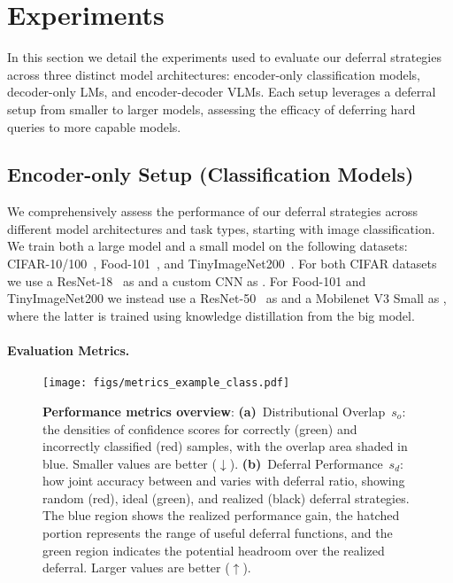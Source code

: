 \section{Experiments}
\label{sec:experiments}

In this section we detail the experiments used to evaluate our deferral strategies across three distinct model architectures: encoder-only classification models, decoder-only LMs, and encoder-decoder VLMs. Each setup leverages a deferral setup from smaller to larger models, assessing the efficacy of deferring hard queries to more capable models. 

\sloppy
\subsection{Encoder-only Setup (Classification Models)}
\label{sec:class_exp}

We comprehensively assess the performance of our deferral strategies across different model architectures and task types, starting with image classification. We train both a large model and a small model on the following datasets: CIFAR-10/100~\citep{krizhevsky2009learning}, Food-101~\citep{bossard14}, and TinyImageNet200~\citep{Le2015TinyIV}. For both CIFAR datasets we use a ResNet-18~\citep{he2016deep} as \bigmodel and a custom CNN as \smallmodel. For Food-101 and TinyImageNet200 we instead use a ResNet-50~\citep{he2016deep} as \bigmodel and a Mobilenet V3 Small \citep{howard2019searching} as \smallmodel, where the latter is trained using knowledge distillation from the big model.

\paragraph{Evaluation Metrics.}

\begin{figure}[t]
    \centering
    \texttt{[image: figs/metrics\_example\_class.pdf]}
    \vspace{-20pt}
    \caption{ 
    \textbf{Performance metrics overview}: \textbf{(a)}~Distributional Overlap~$s_o$: the densities of confidence scores for correctly (green) and incorrectly classified (red) samples, with the overlap area shaded in blue. Smaller values are better ($\downarrow$).
    \textbf{(b)}~Deferral Performance~$s_d$: how joint accuracy between \smallmodel and \bigmodel varies with deferral ratio, showing random (red), ideal (green), and realized (black) deferral strategies. 
    The blue region shows the realized performance gain, the hatched portion represents the range of useful deferral functions, and the green region indicates the potential headroom over the realized deferral. Larger values are better ($\uparrow$).}
    \label{fig:metrics_illustration}
\end{figure}

